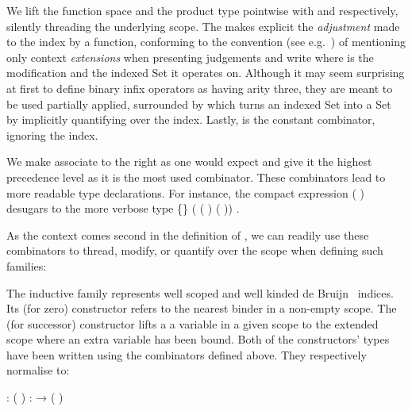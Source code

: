 We lift the function space and the product type pointwise with
 and  respectively, silently threading the
underlying scope. The  makes explicit the \emph{adjustment} made to the index
by a function, conforming to the convention (see e.g.~\cite{martin1982constructive}) of mentioning only
context \emph{extensions} when presenting judgements
and write    where  is the modification and  the indexed
Set it operates on. Although it may seem surprising at first to define binary
infix operators as having arity three, they are meant to be used partially applied,
surrounded by  which turns an indexed Set into a Set by implicitly
quantifying over the index.
Lastly,  is the constant combinator, ignoring the index.

We make  associate to the right as one would expect and give it the
highest precedence level as it is the most used combinator. These combinators
lead to more readable type declarations.  For instance, the compact expression
\AF{∀[}   (  )   \AF{]}
desugars to the more verbose type
 \{\}  ( ( )   ( ))   .

As the context comes second in the definition of , we
can readily use these combinators to thread, modify, or quantify over the
scope when defining such families:

\begin{minipage}[t]{0.35\textwidth}
\end{minipage}\hfill
\begin{minipage}[t]{0.55\textwidth}
\end{minipage}

The inductive family  represents well scoped and well kinded
de Bruijn~\citeyear{de1972lambda}
indices. Its  (for zero) constructor refers to
the nearest binder in a non-empty scope. The  (for successor) constructor lifts a
a variable in a given scope to the extended scope where
an extra variable has been bound. Both of the constructors' types have been written using the combinators defined above.
They respectively normalise to:
\begin{center}
   : {      ( \AIC{::} )}
  \qquad
   : {    →       ( \AIC{::} )}
\end{center}

